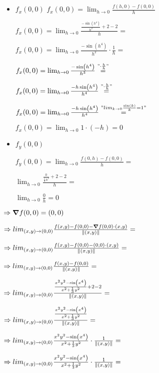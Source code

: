 \documentclass[../parcial.tex]{subfiles}
\begin{document}
    \begin{itemize}
        \item $f_x(0,0)$
            $ f_x(0,0) = \lim_{h \to 0} \frac{f(h,0) - f(0,0)}{h} $
        
            $ f_x(0,0) = \lim_{h \to 0} \frac{\frac{-\sin(h^4)}{h^2} + 2 - 2}{h} = $
        
            $ f_x(0,0) = \lim_{h \to 0} \frac{-\sin(h^4)}{h^2}\cdot\frac{1}{h} = $
        
            $ f_x(0,0) = \lim_{h \to 0} \frac{-\sin(h^4)}{h^3} \stackrel{"\cdot \frac{h}{h}"}{=} $
        
            $ f_x(0,0) = \lim_{h \to 0} \frac{-h\sin(h^4)}{h^4} \stackrel{"\cdot \frac{h}{h}"}{=} $
        
            $ f_x(0,0) = \lim_{h \to 0} \frac{-h\sin(h^4)}{h^4} \stackrel{"lim_{k \to 0} \frac{\sin(k)}{k} = 1"}{=} $
        
            $ f_x(0,0) = \lim_{h \to 0} 1\cdot(-h) = 0 $

        \item $f_y(0,0)$
        
            $ f_y(0,0) = \lim_{h \to 0} \frac{f(0,h) - f(0,0)}{h} = $

            $ \lim_{h \to 0} \frac{\frac{0}{\frac{1}{3} h^2} + 2 - 2}{h} = $

            $ \lim_{h \to 0} \frac{0}{h} = 0 $

    \end{itemize}

    $\Rightarrow \grad f(0,0) = (0,0)$

    $ \Rightarrow  lim_{(x,y) \to (0,0)} \frac{f(x,y) - f(0,0) - \grad f(0,0)\cdot(x,y) }{\norm*{(x,y)}} = $

    $ \Rightarrow  lim_{(x,y) \to (0,0)} \frac{f(x,y) - f(0,0) - (0,0)\cdot(x,y) }{\norm*{(x,y)}} = $

    $ \Rightarrow  lim_{(x,y) \to (0,0)} \frac{f(x,y) - f(0,0)}{\norm*{(x,y)}} = $

    $ \Rightarrow  lim_{(x,y) \to (0,0)} \frac{\frac{x^2y^2-\sin(x^4)}{x^2 + \frac{1}{3} y^2} + 2 - 2}{\norm*{(x,y)}} = $

    $ \Rightarrow  lim_{(x,y) \to (0,0)} \frac{\frac{x^2y^2-\sin(x^4)}{x^2 + \frac{1}{3} y^2}}{\norm*{(x,y)}} = $

    $ \Rightarrow  lim_{(x,y) \to (0,0)} \frac{x^2y^2-\sin(x^4)}{x^2 + \frac{1}{3} y^2} \cdot\frac{1}{\norm*{(x,y)}} = $

    $ \Rightarrow  lim_{(x,y) \to (0,0)} \frac{x^2y^2-\sin(x^4)}{x^2 + \frac{1}{3} y^2} \cdot\frac{1}{\norm*{(x,y)}} = $
\end{document}
